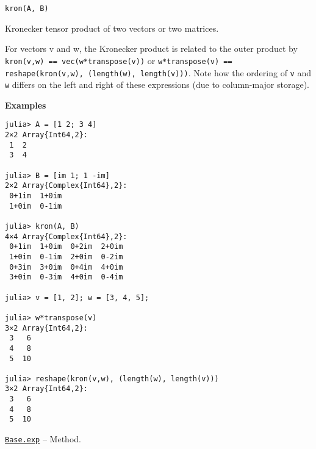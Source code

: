 \begin{adjustwidth}{2em}{0pt}


\begin{verbatim}
kron(A, B)
\end{verbatim}

Kronecker tensor product of two vectors or two matrices.

For vectors v and w, the Kronecker product is related to the outer product by \texttt{kron(v,w) == vec(w*transpose(v))} or \texttt{w*transpose(v) == reshape(kron(v,w), (length(w), length(v)))}. Note how the ordering of \texttt{v} and \texttt{w} differs on the left and right of these expressions (due to column-major storage).

\textbf{Examples}


\begin{verbatim}
julia> A = [1 2; 3 4]
2×2 Array{Int64,2}:
 1  2
 3  4

julia> B = [im 1; 1 -im]
2×2 Array{Complex{Int64},2}:
 0+1im  1+0im
 1+0im  0-1im

julia> kron(A, B)
4×4 Array{Complex{Int64},2}:
 0+1im  1+0im  0+2im  2+0im
 1+0im  0-1im  2+0im  0-2im
 0+3im  3+0im  0+4im  4+0im
 3+0im  0-3im  4+0im  0-4im

julia> v = [1, 2]; w = [3, 4, 5];

julia> w*transpose(v)
3×2 Array{Int64,2}:
 3   6
 4   8
 5  10

julia> reshape(kron(v,w), (length(w), length(v)))
3×2 Array{Int64,2}:
 3   6
 4   8
 5  10
\end{verbatim}



\end{adjustwidth}
\hypertarget{5268595831230934390}{} 
\hyperlink{5268595831230934390}{\texttt{Base.exp}}  -- {Method.}

